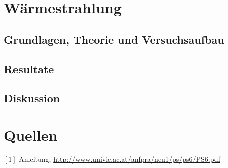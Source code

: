 \documentclass[12pt,a4paper]{article}
\begin{document}
\begin{multicols}{2}
\section{Wärmestrahlung}

\subsection{Grundlagen, Theorie und Versuchsaufbau}


\subsection{Resultate}

\subsection{Diskussion}




\section{Quellen}
$[1]$ Anleitung, \url{http://www.univie.ac.at/anfpra/neu1/ps/ps6/PS6.pdf}\\

\end{multicols}
\end{document}
